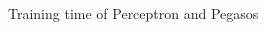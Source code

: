 \documentclass{article}
\begin{document}
   \begin{figure}[H]  
   \begin{adjustwidth}{-4em}{-4em}
     \hfill
     
     \hfill
     \caption{Training time of Perceptron and Pegasos}
     \label{time plot}
   \end{adjustwidth}
   \end{figure}
   
\end{document}
